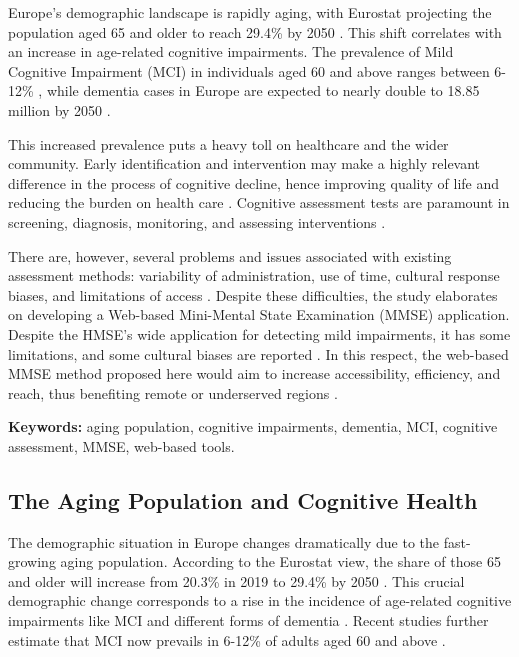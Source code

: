 Europe's demographic landscape is rapidly aging, with Eurostat projecting the population aged 65 and older to reach 29.4\% by 2050 \cite{Eurostat2020}. This shift correlates with an increase in age-related cognitive impairments. The prevalence of Mild Cognitive Impairment (MCI) in individuals aged 60 and above ranges between 6-12\% \cite{Petersen2018}, while dementia cases in Europe are expected to nearly double to 18.85 million by 2050 \cite{AlzheimerEurope2019}.

This increased prevalence puts a heavy toll on healthcare and the wider community. Early identification and intervention may make a highly relevant difference in the process of cognitive decline, hence improving quality of life and reducing the burden on health care \cite{Livingston2020}. Cognitive assessment tests are paramount in screening, diagnosis, monitoring, and assessing interventions \cite{Cullen2007, Petersen2018}.

There are, however, several problems and issues associated with existing assessment methods: variability of administration, use of time, cultural response biases, and limitations of access \cite{Prince2013, Cordell2013, Henrich2010, Goldberg2015, Geddes2020, Bilder2020}. Despite these difficulties, the study elaborates on developing a Web-based Mini-Mental State Examination (MMSE) application. Despite the HMSE's wide application for detecting mild impairments, it has some limitations, and some cultural biases are reported \cite{Folstein1975, Tombaugh1992}. In this respect, the web-based MMSE method proposed here would aim to increase accessibility, efficiency, and reach, thus benefiting remote or underserved regions \cite{Bauer2012, Zygouris2017, Seifan2015}.

\textbf{Keywords:} aging population, cognitive impairments, dementia, MCI, cognitive assessment, MMSE, web-based tools.

\subsection{The Aging Population and Cognitive Health}

The demographic situation in Europe changes dramatically due to the fast-growing aging population. According to the Eurostat view, the share of those 65 and older will increase from 20.3\% in 2019 to 29.4\% by 2050 \cite{Eurostat2020}. This crucial demographic change corresponds to a rise in the incidence of age-related cognitive impairments like MCI and different forms of dementia \cite{Livingston2020}. Recent studies further estimate that MCI now prevails in 6-12\% of adults aged 60 and above \cite{Petersen2018}.

